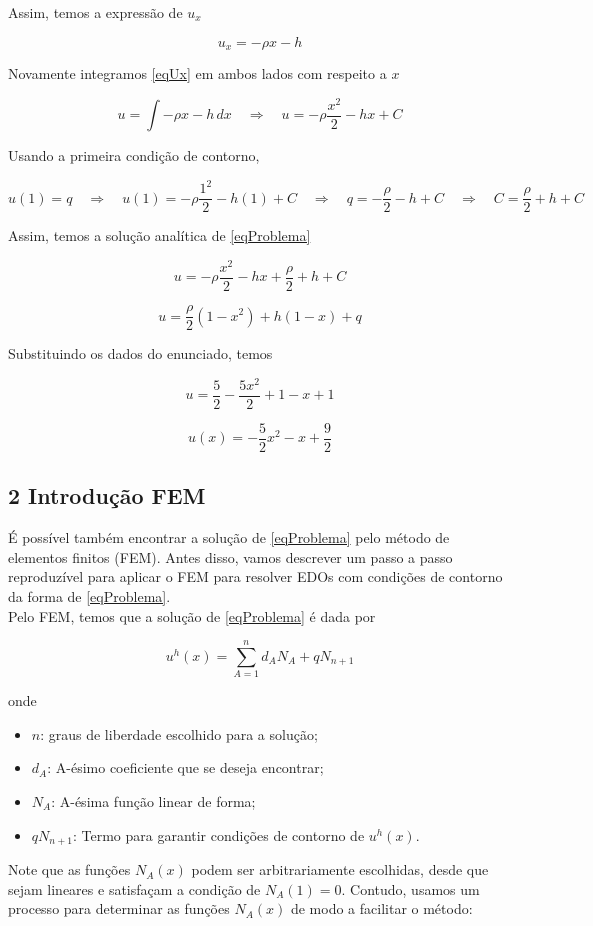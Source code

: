\documentclass[12pt]{scrartcl}
\newcommand{\logo}{\quad \Rightarrow \quad}
\begin{document}
Assim, temos a expressão de $u_x$

\begin{equation}\label{eqUx}
    u_x = - \rho x  - h
\end{equation}

Novamente integramos \eqref{eqUx} em ambos lados com respeito a $x$

\[
    u = \int -\rho x - h \, dx
    \logo
    u = - \rho \frac{x^2}{2} - hx + C
\]

Usando a primeira condição de contorno,

\[
    u(1) = q
    \logo
    u(1) = - \rho \frac{1^2}{2} - h(1) + C
    \logo
    q = - \frac{\rho}{2} - h + C
    \logo
    C = \frac{\rho}{2} + h + C
\]

Assim, temos a solução analítica de \eqref{eqProblema}

\[
    u = - \rho \frac{x^2}{2} - hx + \frac{\rho}{2} + h + C
\]

\begin{equation}\label{eqU}
    u = \frac{\rho}{2} \left(1 - x^2\right) + h\left(1 - x\right) + q
\end{equation}

Substituindo os dados do enunciado, temos

\[
    u = \frac{5}{2} - \frac{5x^2}{2} + 1 - x + 1
\]

\begin{equation}\label{eqUsubstituida}
    u(x) = -\frac{5}{2}x^2 - x + \frac{9}{2}
\end{equation}

\subsection*{2 Introdução FEM}

É possível também encontrar a solução de \eqref{eqProblema} pelo método de elementos finitos (FEM). Antes disso, vamos descrever um passo a passo
reproduzível para aplicar o FEM para resolver EDOs com condições de contorno da forma de \eqref{eqProblema}. \\

Pelo FEM, temos que a solução de \eqref{eqProblema} é dada por

\begin{equation}\label{eqUhFEM}
    u^h(x) = \sum_{A=1}^n d_AN_A + qN_{n+1}
\end{equation}

onde

\begin{itemize}
    \item $n$: graus de liberdade escolhido para a solução;
    \item $d_A$: A-ésimo coeficiente que se deseja encontrar;
    \item $N_A$: A-ésima função linear de forma;
    \item $qN_{n+1}$: Termo para garantir condições de contorno de $u^h(x)$.
\end{itemize}

Note que as funções $N_A(x)$ podem ser arbitrariamente escolhidas, desde que sejam lineares e satisfaçam a condição de $N_A(1) = 0$. 
Contudo, usamos um processo para determinar as funções $N_A(x)$ de modo a facilitar o método:
\end{document}
